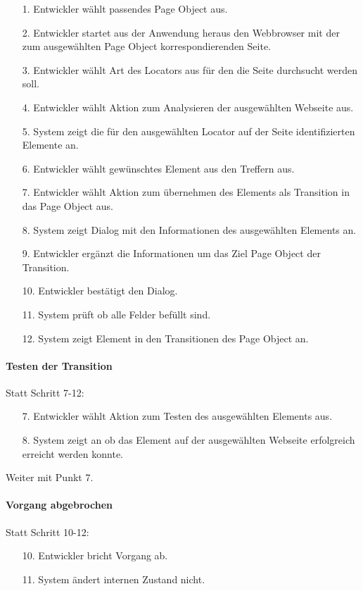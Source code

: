 \begin{itemize}[itemsep=0pt]
\item[1.] Entwickler wählt passendes Page Object aus.
\item[2.] Entwickler startet aus der Anwendung heraus den Webbrowser mit der zum ausgewählten Page Object korrespondierenden Seite. 
\item[3.] Entwickler wählt Art des Locators aus für den die Seite durchsucht werden soll.
\item[4.] Entwickler wählt Aktion zum Analysieren der ausgewählten Webseite aus.
\item[5.] System zeigt die für den ausgewählten Locator auf der Seite identifizierten Elemente an.
\item[6.] Entwickler wählt gewünschtes Element aus den Treffern aus. 
\item[7.] Entwickler wählt Aktion zum übernehmen des Elements als Transition in das Page Object aus.
\item[8.] System zeigt Dialog mit den Informationen des ausgewählten Elements an.
\item[9.] Entwickler ergänzt die Informationen um das Ziel Page Object der Transition.
\item[10.] Entwickler bestätigt den Dialog.
\item[11.] System prüft ob alle Felder befüllt sind.
\item[12.] System zeigt Element in den Transitionen des Page Object an.
\end{itemize}

\paragraph{Testen der Transition}
Statt Schritt 7-12:
\begin{itemize}
\item[7.] Entwickler wählt Aktion zum Testen des ausgewählten Elements aus. 
\item[8.] System zeigt an ob das Element auf der ausgewählten Webseite erfolgreich erreicht werden konnte. 
\end{itemize}
Weiter mit Punkt 7.

\paragraph{Vorgang abgebrochen}
Statt Schritt 10-12:
\begin{itemize}[itemsep=0pt]
\item[10.] Entwickler bricht Vorgang ab. 
\item[11.] System ändert internen Zustand nicht. 
\end{itemize}

